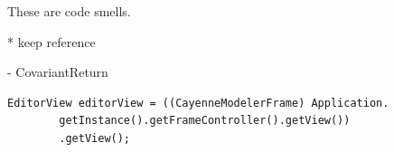 These are code smells.













* keep reference \cite{altidorTamingWildcardsCombining2011}

- CovariantReturn
\begin{verbatim}
EditorView editorView = ((CayenneModelerFrame) Application.
        getInstance().getFrameController().getView())
        .getView();
\end{verbatim}
